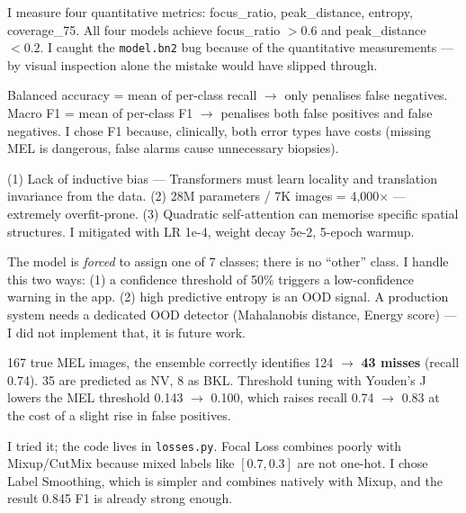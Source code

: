 \documentclass[11pt,a4paper]{article}
\begin{document}
\begin{qa}
I measure four quantitative metrics: focus\_ratio, peak\_distance, entropy, coverage\_75. All four models achieve focus\_ratio $> 0.6$ and peak\_distance $< 0.2$. I caught the \texttt{model.bn2} bug because of the quantitative measurements --- by visual inspection alone the mistake would have slipped through.
\end{qa}

\begin{qa}
Balanced accuracy = mean of per-class recall $\to$ only penalises false negatives. Macro F1 = mean of per-class F1 $\to$ penalises both false positives and false negatives. I chose F1 because, clinically, both error types have costs (missing MEL is dangerous, false alarms cause unnecessary biopsies).
\end{qa}

\begin{qa}
(1) Lack of inductive bias --- Transformers must learn locality and translation invariance from the data. (2) 28M parameters / 7K images = 4{,}000$\times$ --- extremely overfit-prone. (3) Quadratic self-attention can memorise specific spatial structures. I mitigated with LR 1e-4, weight decay 5e-2, 5-epoch warmup.
\end{qa}

\begin{qa}
The model is \textit{forced} to assign one of 7 classes; there is no ``other'' class. I handle this two ways: (1) a confidence threshold of 50\% triggers a low-confidence warning in the app. (2) high predictive entropy is an OOD signal. A production system needs a dedicated OOD detector (Mahalanobis distance, Energy score) --- I did not implement that, it is future work.
\end{qa}

\begin{qa}
167 true MEL images, the ensemble correctly identifies 124 $\to$ \textbf{43 misses} (recall 0.74). 35 are predicted as NV, 8 as BKL. Threshold tuning with Youden's J lowers the MEL threshold 0.143 $\to$ 0.100, which raises recall 0.74 $\to$ 0.83 at the cost of a slight rise in false positives.
\end{qa}

\begin{qa}
I tried it; the code lives in \texttt{losses.py}. Focal Loss combines poorly with Mixup/CutMix because mixed labels like $[0.7, 0.3]$ are not one-hot. I chose Label Smoothing, which is simpler and combines natively with Mixup, and the result 0.845 F1 is already strong enough.
\end{qa}
\end{document}
